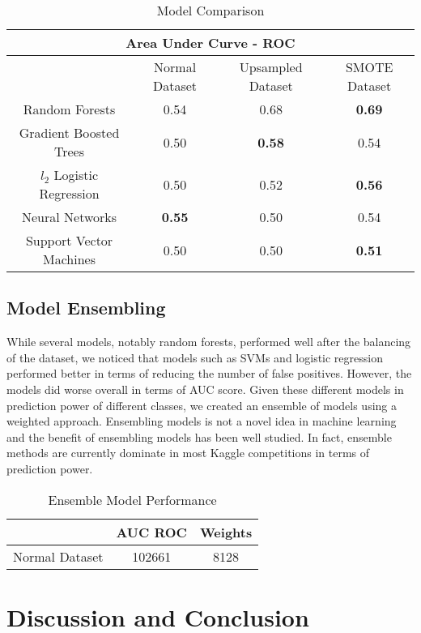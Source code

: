 \documentclass[twoside,11pt]{article}
\begin{document}
\begin{table}[h]
\centering
\caption{Model Comparison}
\label{model_results}
\begin{tabular}{|c||c|c|c|}
  \hline
  \multicolumn{4}{|c|}{Area Under Curve - ROC} \\
  \hline
  & Normal Dataset& Upsampled Dataset & SMOTE Dataset \\
  \hline
  Random Forests  & 0.54 & 0.68 & \textbf{0.69} \\
  Gradient Boosted Trees   & 0.50 & \textbf{0.58} & 0.54 \\
  $l_2$ Logistic Regression  & 0.50 & 0.52 & \textbf{0.56} \\
  Neural Networks & \textbf{0.55} & 0.50 & 0.54\\
  Support Vector Machines & 0.50 & 0.50 & \textbf{0.51} \\
  \hline
\end{tabular}
\end{table}
\subsection*{Model Ensembling}
While several models, notably random forests, performed well after the balancing
of the dataset, we noticed that models such as SVMs and logistic regression
performed better in terms of reducing the number of false positives. However,
the models did worse overall in terms of AUC score. Given these different
models in prediction power of different classes, we created an ensemble of
models using a weighted approach. Ensembling models is not a novel idea in
machine learning and the benefit of ensembling models has been well
studied.  In fact, ensemble methods are currently dominate in most Kaggle
competitions in terms of prediction power.

\begin{table}[h]
\centering
\caption{Ensemble Model Performance}
\label{ensembleModel}
\begin{tabular}{ccc}
\hline
   & AUC ROC & Weights\\ \hline
  Normal Dataset & 102661 & 8128\\
\end{tabular}
\end{table}
\section{Discussion and Conclusion} 


\end{document}
